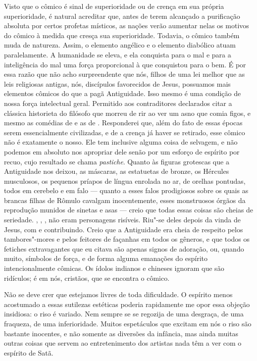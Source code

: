 Visto que o cômico é sinal de superioridade ou de crença em sua própria
superioridade, é natural acreditar que, antes de terem alcançado a
purificação absoluta por certos profetas místicos, as nações verão
aumentar nelas os motivos do cômico à medida que cresça sua
superioridade. Todavia, o cômico também muda de natureza. Assim, o
elemento angélico e o elemento diabólico atuam paralelamente. A
humanidade se eleva, e ela conquista para o mal e para a inteligência
do mal uma força proporcional à que conquistou para o bem. É por essa
razão que não acho surpreendente que nós, filhos de uma lei melhor que
as leis religiosas antigas, nós, discípulos favorecidos de Jesus,
possuamos mais elementos cômicos do que a pagã Antiguidade. Isso mesmo
é uma condição de nossa força intelectual geral. Permitido aos
contraditores declarados citar a clássica historieta do filósofo que
morreu de rir ao ver um asno que comia figos, e mesmo as comédias de
 e as de . Responderei que, além do fato de essas
épocas serem essencialmente civilizadas, e de a crença já haver se
retirado, esse cômico não é exatamente o nosso. Ele tem inclusive
alguma coisa de selvagem, e não podemos em absoluto nos apropriar dele
senão por um esforço de espírito por recuo, cujo resultado se chama
\textit{pastiche}. Quanto às figuras grotescas que a Antiguidade nos
deixou, as máscaras, as estatuetas de bronze, os Hércules musculosos,
os pequenos príapos de língua enrolada no ar, de orelhas pontudas,
todos em cerebelo e em falo --- quanto a esses falos prodigiosos sobre os
quais as brancas filhas de Rômulo cavalgam inocentemente, esses
monstruosos órgãos da reprodução munidos de sinetas e asas --- creio que
todas essas coisas são cheias de seriedade. , , , não
eram personagens risíveis. Riu"-se deles depois da vinda de Jesus, com
 e  contribuindo. Creio que a Antiguidade era cheia de
respeito pelos tambores"-mores e pelos feitores de façanhas em todos os
gêneros, e que todos os fetiches extravagantes que eu citava são apenas
signos de adoração, ou, quando muito, símbolos de força, e de forma
alguma emanações do espírito intencionalmente cômicas. Os ídolos
indianos e chineses ignoram que são ridículos; é em nós, cristãos, que
se encontra o cômico.

\sectionitem

Não se deve crer que estejamos livres de toda dificuldade. O espírito
menos acostumado a essas sutilezas estéticas poderia rapidamente me
opor essa objeção insidiosa: o riso é variado. Nem sempre se se
regozija de uma desgraça, de uma fraqueza, de uma inferioridade. Muitos
espetáculos que excitam em nós o riso são bastante inocentes, e não
somente as diversões da infância, mas ainda muitas outras coisas que
servem ao entretenimento dos artistas nada têm a ver com o espírito de
Satã.

